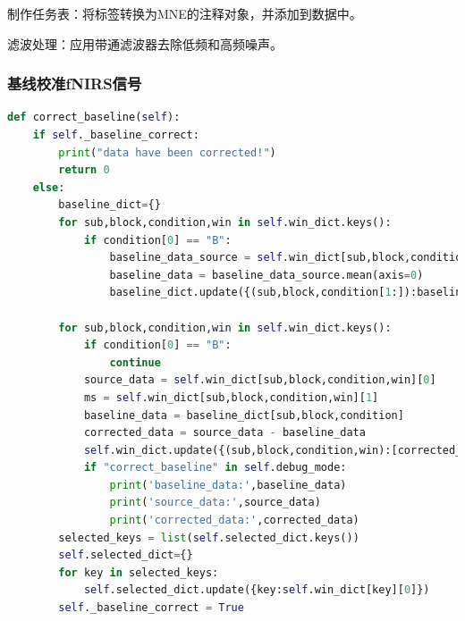 \documentclass[a4paper,12pt]{article}
\begin{document}
制作任务表：将标签转换为MNE的注释对象，并添加到数据中。

滤波处理：应用带通滤波器去除低频和高频噪声。

\subsubsection{基线校准fNIRS信号}
\begin{lstlisting}[language=python]
def correct_baseline(self):
    if self._baseline_correct:
        print("data have been corrected!")
        return 0
    else:
        baseline_dict={}
        for sub,block,condition,win in self.win_dict.keys():
            if condition[0] == "B":
                baseline_data_source = self.win_dict[sub,block,condition,win][0]
                baseline_data = baseline_data_source.mean(axis=0)
                baseline_dict.update({(sub,block,condition[1:]):baseline_data})

        for sub,block,condition,win in self.win_dict.keys():
            if condition[0] == "B":
                continue
            source_data = self.win_dict[sub,block,condition,win][0]
            ms = self.win_dict[sub,block,condition,win][1]
            baseline_data = baseline_dict[sub,block,condition]
            corrected_data = source_data - baseline_data
            self.win_dict.update({(sub,block,condition,win):[corrected_data,ms]})
            if "correct_baseline" in self.debug_mode:
                print('baseline_data:',baseline_data)
                print('source_data:',source_data)
                print('corrected_data:',corrected_data)
        selected_keys = list(self.selected_dict.keys())
        self.selected_dict={}
        for key in selected_keys:
            self.selected_dict.update({key:self.win_dict[key][0]})
        self._baseline_correct = True
\end{lstlisting}
\end{document}
